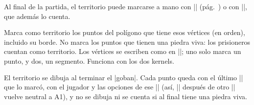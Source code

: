 	Al final de la partida, el territorio puede marcarse a mano con |\marks| (pág.~\pageref{sec:marcas}) o con |\territory|, que además lo cuenta.

	\begin{command}{\territory{}}
		Marca como territorio los puntos del polígono que tiene esos vértices (en orden), incluido su borde. No marca los puntos que tienen una piedra viva: los prisioneros cuentan como territorio. Los vértices se escriben como en |\stones|; uno solo marca un punto, y dos, un segmento. Funciona con los dos kernels.

		El territorio se dibuja al terminar el |goban|. Cada punto queda con el último |\territory| que lo marcó, con el jugador y las opciones de ese |\territory| (así, || después de otro |\territory| vuelve neutral a A1), y no se dibuja ni se cuenta si al final tiene una piedra viva.

		\begin{codeexample}[width=4.75cm]
			\begin{goban}[label = {at = {above, left}}]

			\end{goban}
		\end{codeexample}
	\end{command}

